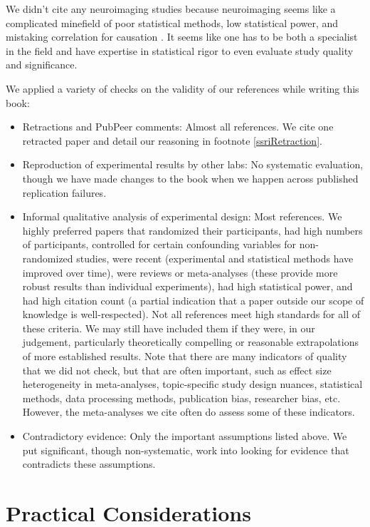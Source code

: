 \documentclass[12pt,letterpaper]{book}
\begin{document}
We didn't cite any neuroimaging studies because neuroimaging seems like a complicated minefield of poor statistical methods, low statistical power, and mistaking correlation for causation \cite{hoelNeuroscience}. It seems like one has to be both a specialist in the field and have expertise in statistical rigor to even evaluate study quality and significance.

We applied a variety of checks on the validity of our references while writing this book:
\begin{itemize}
    \item Retractions and PubPeer comments: Almost all references. We cite one retracted paper and detail our reasoning in footnote \ref{ssriRetraction}.
    \item Reproduction of experimental results by other labs: No systematic evaluation, though we have made changes to the book when we happen across published replication failures.
    \item Informal qualitative analysis of experimental design: Most references. We highly preferred papers that randomized their participants, had high numbers of participants, controlled for certain confounding variables for non-randomized studies, were recent (experimental and statistical methods have improved over time), were reviews or meta-analyses (these provide more robust results than individual experiments), had high statistical power, and had high citation count (a partial indication that a paper outside our scope of knowledge is well-respected). Not all references meet high standards for all of these criteria. We may still have included them if they were, in our judgement, particularly theoretically compelling or reasonable extrapolations of more established results. Note that there are many indicators of quality that we did not check, but that are often important, such as effect size heterogeneity in meta-analyses, topic-specific study design nuances, statistical methods, data processing methods, publication bias, researcher bias, etc. However, the meta-analyses we cite often do assess some of these indicators.
    \item Contradictory evidence: Only the important assumptions listed above. We put significant, though non-systematic, work into looking for evidence that contradicts these assumptions.
\end{itemize}
\chapter{Practical Considerations}
\end{document}
